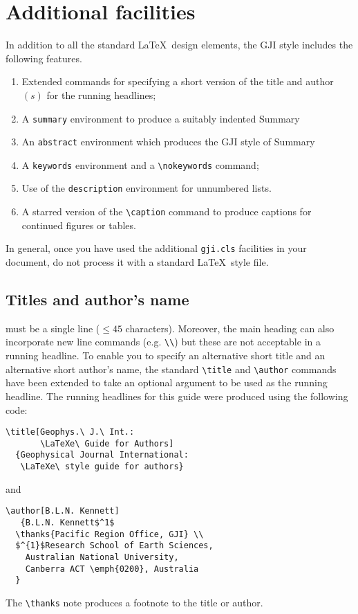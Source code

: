 \section{Additional facilities}

In addition to all the standard \LaTeX\ design elements, the GJI style
includes the following features.
\begin{enumerate}
  \item Extended commands for specifying a short version of the title and
        author$(s)$ for the running headlines;
  \item A \verb"summary" environment to produce a suitably indented
        Summary
  \item An \verb"abstract" environment which produces the GJI style of
        Summary
  \item A \verb"keywords" environment and a \verb"\nokeywords" command;
  \item Use of the \verb"description" environment for unnumbered lists.
  \item A starred version of the \verb"\caption" command to produce
        captions for continued figures or tables.
 \end{enumerate}
 In general, once you have used the additional \verb"gji.cls" facilities
in your document, do not process it with a standard \LaTeX\ style file.

\subsection{Titles and author's name}

must be a single line ($\leqslant 45$ characters). Moreover, the main
heading can also incorporate new line commands (e.g. \verb"\\") but
these are not acceptable in a running headline. To enable you to
specify an alternative short title and an alternative short author's
name, the standard \verb"\title" and \verb"\author" commands have been
extended to take an optional argument to be used as the running
headline. The running headlines for this guide were produced using the
following code:
\begin{verbatim}
\title[Geophys.\ J.\ Int.:
       \LaTeXe\ Guide for Authors]
  {Geophysical Journal International:
   \LaTeXe\ style guide for authors}
\end{verbatim}
and
\begin{verbatim}
\author[B.L.N. Kennett]
   {B.L.N. Kennett$^1$
  \thanks{Pacific Region Office, GJI} \\
  $^{1}$Research School of Earth Sciences,
    Australian National University,
    Canberra ACT \emph{0200}, Australia
  }
\end{verbatim}
The \verb"\thanks" note produces a footnote to the title or author.

